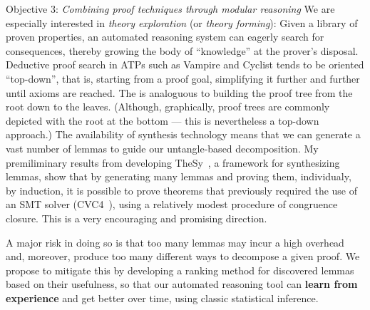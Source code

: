 \begin{paragraph}{Objective 3: {\it Combining proof techniques through modular reasoning}}
We are especially interested in \emph{theory exploration} (or \emph{theory forming}):
Given a library of proven properties, an automated reasoning system can eagerly search for consequences, thereby growing the body of ``knowledge'' at the prover's disposal.
Deductive proof search in ATPs such as Vampire and Cyclist tends to be oriented ``top-down'', that is,
starting from a proof goal, simplifying it further and further until axioms are reached.
The is analoguous to building the proof tree from the root down to the leaves. (Although, graphically, proof trees are commonly depicted with the root at the bottom --- this is nevertheless a top-down approach.)
The availability of synthesis technology \cite{quickspec,thesy} means that we can generate a vast number of lemmas to guide our untangle-based decomposition.
My premiliminary results from developing TheSy~\cite{thesy}, a framework for synthesizing lemmas, show that by generating many lemmas and proving them, individualy, by induction, it is possible to prove theorems that previously required the use of an SMT solver (CVC4~\cite{cvc4-ig}), using a relatively modest procedure of congruence closure.
This is a very encouraging and promising direction.

A major risk in doing so is that too many lemmas may incur a high overhead and, moreover, produce too many different ways to decompose a given proof.
We propose to mitigate this by developing a ranking method for discovered lemmas based on their usefulness,
so that our automated reasoning tool can \textbf{learn from experience} and get better over time, using classic statistical inference.
\end{paragraph}

